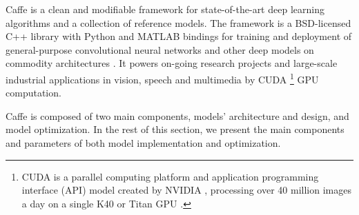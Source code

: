 Caffe is a clean and modifiable framework for state-of-the-art deep learning algorithms and a collection of reference models. The framework is a BSD-licensed C++ library with Python and MATLAB bindings for training and deployment of general-purpose convolutional neural networks and other deep models on commodity architectures \cite{jia2014caffe}. It powers on-going research projects and large-scale industrial applications in vision, speech and multimedia by CUDA \footnote{CUDA is a parallel computing platform and application programming interface (API) model created by NVIDIA \cite{cuda}, processing over 40 million images a day on a single K40 or Titan GPU \cite{jia2014caffe}.}  GPU computation.

Caffe is composed of two main components, models' architecture and design, and model optimization. In the rest of this section, we present the main components and parameters of both model implementation and optimization.
